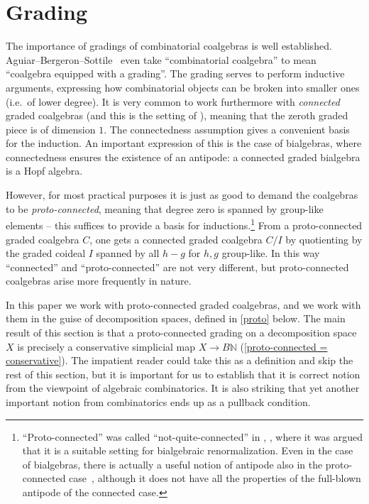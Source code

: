 \documentclass{amsart}
\newcommand{\proto}{proto}
\newcommand{\N}{\mathbb{N}}
\theoremstyle{definition}
\theoremstyle{noname}
\begin{document}
\section{Grading}

\label{sec:grading}


The importance of gradings of combinatorial coalgebras is well established.
Aguiar--Bergeron--Sottile~\cite{Aguiar-Bergeron-Sottile} even take
``combinatorial coalgebra'' to mean ``coalgebra equipped with a grading''. The
grading serves to perform inductive arguments, expressing how combinatorial
objects can be broken into smaller ones (i.e.~of lower degree). It is very
common to work furthermore with {\em connected} graded coalgebras (and this is
the setting of \cite{Aguiar-Bergeron-Sottile}), meaning that the zeroth graded 
piece is of
dimension $1$. The connectedness assumption gives a convenient basis for
the induction. An important expression of this is the case of bialgebras, where
connectedness ensures the existence of an antipode: a connected graded bialgebra
is a Hopf algebra. 

However, for most practical purposes it is just as good to demand the coalgebras to be
{\em \proto-connected}, meaning that degree zero is spanned by group-like elements --
this suffices to provide a basis for
inductions.\footnote{``Proto-connected'' was called ``not-quite-connected'' in
\cite{Kock:1411.3098}, \cite{Kock:1809.00941}, where it was argued that it is a
suitable setting for bialgebraic renormalization. Even in the case of bialgebras,
there is actually a useful notion of antipode also in the \proto-connected
case~\cite{Carlier-Kock:1807.11858}, although it does not have all the properties of
the full-blown antipode of the connected case.} 
From a \proto-connected graded coalgebra $C$, one gets a connected
graded coalgebra $C/I$ by quotienting by the graded coideal $I$ spanned by all $h-g$
for $h,g$ group-like. In this way ``connected'' and ``\proto-connected'' are not very
different, but \proto-connected coalgebras arise more frequently in nature.

In this paper we work with \proto-connected graded coalgebras, and we work with them 
in the guise of decomposition spaces, defined in \ref{proto} below. 
The main result of this section is that a proto-connected grading on a decomposition space $X$ is precisely a conservative simplicial map $X\to B\N$ (\cref{proto-connected = conservative}).
The impatient reader could take this as a definition and skip the 
rest of this
section, but it is important for us to establish that it is correct notion from
the viewpoint of algebraic combinatorics. It is also striking that yet another 
important notion from combinatorics ends up as a pullback condition.
\end{document}
